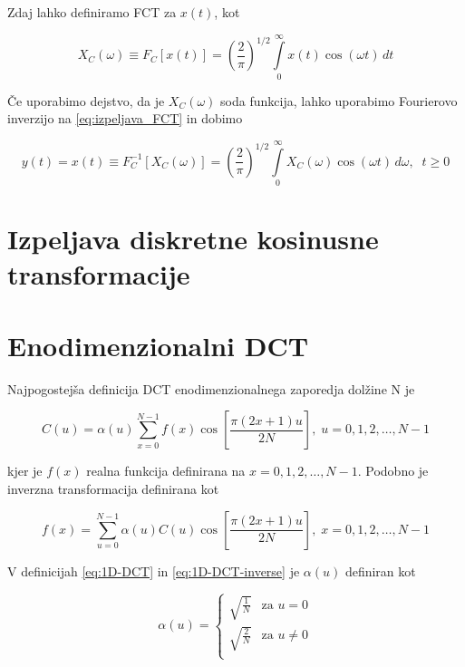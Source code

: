 \documentclass[a4paper,12pt,openright]{book}
\begin{document}
Zdaj lahko definiramo FCT za \(x(t)\), kot

\begin{equation}
X_C(\omega) \equiv F_C[x(t)]= \left( \frac{2}{\pi} \right)^{1/2} 
                          \int\limits_{0}^{\infty} x(t)  \cos(\omega t) \,dt
\label{eq:FCT}
\end{equation}

Če uporabimo dejstvo, da je \(X_C(\omega)\) soda funkcija, lahko uporabimo Fourierovo inverzijo na \ref{eq:izpeljava_FCT} in dobimo

\begin{equation}
y(t) = x(t) \equiv F_C^{-1}[X_C(\omega)]= \left( \frac{2}{\pi} \right)^{1/2} 
            \int\limits_{0}^{\infty} X_C(\omega)  \cos(\omega t) \,d\omega, \;\; t \geq 0
\label{eq:Inverzni_FCT}
\end{equation}


\section{Izpeljava diskretne kosinusne transformacije}


\section{Enodimenzionalni DCT}%
Najpogostejša definicija DCT enodimenzionalnega zaporedja dolžine N je %

\begin{equation}
C(u) = \alpha(u)  \sum_{x=0}^{N-1} f(x)\cos\left[\frac{\pi(2x+1)u}{2N}\right],  \; 
u = 0,1,2,\ldots,N-1
\label{eq:1D-DCT}
\end{equation}

kjer je \(f(x)\) realna funkcija definirana na \(x = 0,1,2,\ldots,N-1\).
Podobno je inverzna transformacija definirana kot 

\begin{equation}
f(x) = \sum_{u=0}^{N-1} \alpha(u)C(u)\cos\left[\frac{\pi(2x+1)u}{2N}\right],  \; 
x = 0,1,2,\ldots,N-1
\label{eq:1D-DCT-inverse}
\end{equation}

V definicijah \ref{eq:1D-DCT} in \ref{eq:1D-DCT-inverse} je \(\alpha(u)\) definiran kot 

\begin{equation}
\alpha(u)=
    \begin{cases}
          \sqrt{\frac{1}{N}} & \text{za $u=0$} \\
          \sqrt{\frac{2}{N}} & \text{za $u\neq 0$} \\
    \end{cases}
\label{eq:definicija_alpha}
\end{equation}
\end{document}
